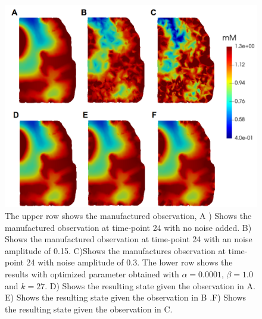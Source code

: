 \documentclass[11pt,a4paper]{article}
\begin{document}
\begin{figure}
\centering
\includegraphics[scale=0.4]{noise-12.png}  
\caption{The upper row shows the manufactured observation, A ) Shows the manufactured observation at time-point 24 with no noise added. B) Shows the manufactured observation at time-point 24 with an noise amplitude of 0.15. C)Shows the manufactures observation at time-point 24 with noise amplitude of 0.3. The lower row shows the results with optimized parameter obtained with $\alpha=0.0001$, $\beta=1.0$ and $k=27$. D) Shows the resulting state given the observation in A. E)  Shows the resulting state given the observation in B .F) Shows the resulting state given the observation in C. }
\label{12hourswithnoise}
\end{figure}
\end{document}
